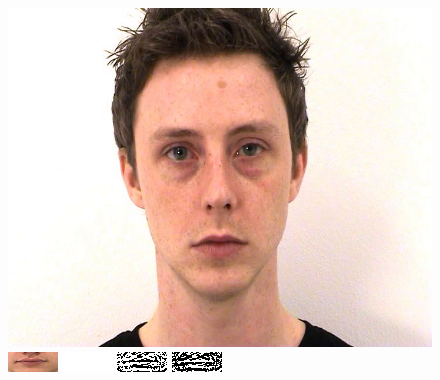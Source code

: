 \documentclass{beamer}
\begin{document}
\begin{frame}
\begin{columns}[c]
      \begin{figure}[position]
      	\centering
        \includegraphics[scale=0.15]{image/img_001.png}
        \vfill
        \vspace{2mm}
        \includegraphics{image/cropped.png}
        \vfill
        \vspace{2mm}
        \includegraphics{image/grayscale.png}
        \vfill
        \vspace{2mm}
        \includegraphics{image/dog_on.png}
        \hspace{3mm}
        \includegraphics{image/dog_off.png}
      \end{figure}
  \end{columns}
\end{frame}

\end{document}
